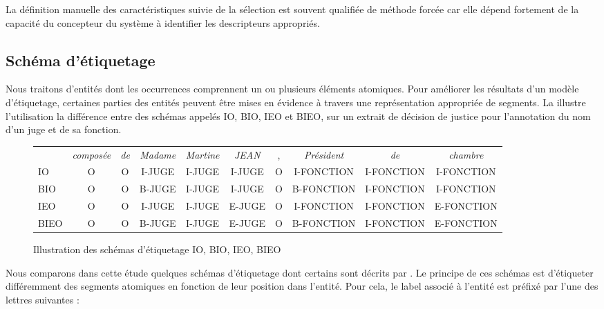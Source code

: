La définition manuelle des caractéristiques suivie de la sélection est souvent qualifiée de méthode forcée car elle dépend fortement de la capacité du concepteur du système à identifier les descripteurs appropriés. 


\subsection{Schéma d'étiquetage}
Nous traitons d'entités dont les occurrences comprennent un ou plusieurs éléments atomiques. Pour améliorer les résultats d'un modèle d'étiquetage, certaines parties des entités peuvent être mises en évidence à travers une représentation appropriée de segments. La  illustre l'utilisation la différence entre des schémas appelés IO, BIO, IEO et BIEO, sur un extrait de décision de justice pour l'annotation du nom d'un juge et de sa fonction.
\begin{figure}[!ht]
	\scriptsize
	\begin{tabular}{l|ccccccccc}
		& \textit{composée} & \textit{de} & \textit{Madame} & \textit{Martine} & \textit{JEAN} & , & \textit{Président} & \textit{de} & \textit{chambre} \\ 
		IO & O & O & I-JUGE & I-JUGE & I-JUGE & O & I-FONCTION & I-FONCTION & I-FONCTION \\
		BIO & O & O & B-JUGE & I-JUGE & I-JUGE & O & B-FONCTION & I-FONCTION & I-FONCTION \\
		IEO & O & O & I-JUGE & I-JUGE & E-JUGE & O & I-FONCTION & I-FONCTION & E-FONCTION\\
		BIEO & O & O & B-JUGE & I-JUGE & E-JUGE & O & B-FONCTION & I-FONCTION & E-FONCTION \\
	\end{tabular}
	\caption{Illustration des schémas d'étiquetage IO, BIO, IEO, BIEO}\label{p4_sample-tagmod}
\end{figure}

Nous comparons dans cette étude quelques schémas d'étiquetage dont certains sont décrits par \citet{konkol2015tagModel}. Le principe de ces schémas est d'étiqueter différemment des segments atomiques en fonction de leur position dans l'entité. Pour cela, le label associé à l'entité est préfixé par l'une des lettres suivantes :


